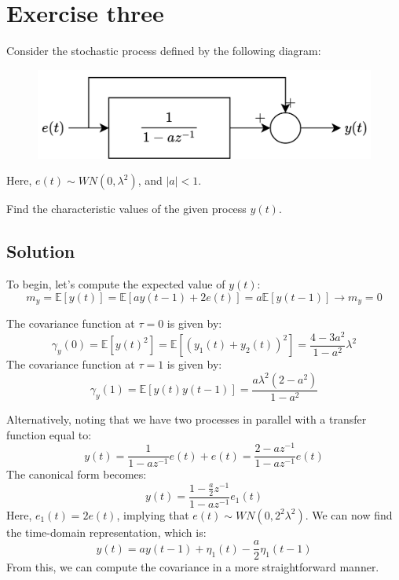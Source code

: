 \section{Exercise three}

Consider the stochastic process defined by the following diagram:
\begin{figure}[H]
    \centering
    \includegraphics[width=0.5\linewidth]{images/block2.png}
\end{figure}
Here, $e(t) \sim WN(0,\lambda^2)$, and $\left\lvert a\right\rvert <1$.

Find the characteristic values of the given process $y(t)$.

\subsection*{Solution}
To begin, let's compute the expected value of $y(t)$:
\[m_y=\mathbb{E}\left[ y(t) \right]=\mathbb{E}\left[ ay(t-1)+2e(t) \right]=a\mathbb{E}\left[ y(t-1) \right]\rightarrow m_y=0\]

The covariance function at $\tau=0$ is given by:
\[\gamma_y(0)=\mathbb{E}\left[ {y(t)}^2 \right]=\mathbb{E}\left[ {\left(y_1(t)+y_2(t)\right)}^2 \right]=\dfrac{4-3a^2}{1-a^2}\lambda^2\]
The covariance function at $\tau=1$ is given by:
\[\gamma_y(1)=\mathbb{E}\left[ y(t)y(t-1) \right]=\dfrac{a\lambda^2(2-a^2)}{1-a^2}\]

Alternatively, noting that we have two processes in parallel with a transfer function equal to:
\[y(t)=\dfrac{1}{1-az^{-1}}e(t)+e(t)=\dfrac{2-az^{-1}}{1-az^{-1}}e(t)\]
The canonical form becomes:
\[y(t)=\dfrac{1-\frac{a}{2}z^{-1}}{1-az^{-1}}e_1(t)\]
Here, $e_1(t)=2e(t)$, implying that $e(t) \sim WN(0,2^2\lambda^2)$.
We can now find the time-domain representation, which is:
\[y(t)=ay(t-1)+\eta_1(t)-\dfrac{a}{2}\eta_1(t-1)\]
From this, we can compute the covariance in a more straightforward manner.